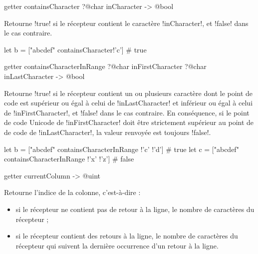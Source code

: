 
\begin{galgasbox}
getter containsCharacter ?@char inCharacter -> @bool
\end{galgasbox}
Retourne \ggs!true! si le récepteur contient le caractère \ggs!inCharacter!, et \ggs!false! dans le cas contraire.

\begin{galgas}
let b = ["abcdef" containsCharacter!'c'] # true
\end{galgas}






\begin{galgasbox}
getter containsCharacterInRange ?@char inFirstCharacter ?@char inLastCharacter -> @bool
\end{galgasbox}

Retourne \ggs!true! si le récepteur contient un ou plusieurs caractère dont le point de code est supérieur ou égal à celui de \ggs!inLastCharacter! et inférieur ou égal à celui de \ggs!inFirstCharacter!, et \ggs!false! dans le cas contraire. En conséquence, si le point de code Unicode de \ggs!inFirstCharacter! doit être strictement supérieur au point de de code de \ggs!inLastCharacter!, la valeur renvoyée est toujours \ggs!false!.

\begin{galgas}
let b = ["abcdef" containsCharacterInRange !'c' !'d'] # true
let c = ["abcdef" containsCharacterInRange !'x' !'z'] # false
\end{galgas}







\begin{galgasbox}
getter currentColumn -> @uint
\end{galgasbox}

Retourne l'indice de la colonne, c'est-à-dire :
\begin{itemize}
\item si le récepteur ne contient pas de retour à la ligne, le nombre de caractères du récepteur ;
\item si le récepteur contient des retours à la ligne, le nombre de caractères du récepteur qui suivent la dernière occurrence d'un retour à la ligne.
\end{itemize}







